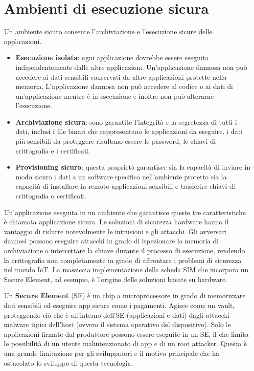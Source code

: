 \section{Ambienti di esecuzione sicura}
Un ambiente sicuro consente l'archiviazione e l'esecuzione sicure delle
applicazioni.
\begin{itemize}
    \item \textbf{Esecuzione isolata}: ogni applicazione dovrebbe essere eseguita
indipendentemente dalle altre applicazioni.
Un'applicazione dannosa non può accedere ai dati sensibili
conservati da altre applicazioni protette nella memoria.
L'applicazione dannosa non può accedere al codice o ai dati di
un'applicazione mentre è in esecuzione e inoltre non può
alterarne l'esecuzione.
    \item \textbf{Archiviazione sicura}: sono garantite l'integrità e la segretezza di tutti
i dati, inclusi i file binari che rappresentano le applicazioni da
eseguire. i dati più sensibili da proteggere risultano essere le
password, le chiavi di crittografia e i certificati.
    \item \textbf{Provisioning sicuro}: questa proprietà garantisce sia la capacità di
inviare in modo sicuro i dati a un software specifico nell'ambiente
protetto sia la capacità di installare in remoto applicazioni sensibili e
trasferire chiavi di crittografia o certificati.
\end{itemize}
Un'applicazione eseguita in un ambiente che garantisce queste tre
caratteristiche è chiamata applicazione sicura. Le soluzioni di sicurezza hardware hanno il vantaggio di ridurre
notevolmente le intrusioni e gli attacchi.
Gli avversari dannosi possono eseguire attacchi
in grado di ispezionare la memoria di archiviazione o intercettare la chiave durante il
processo di esecuzione, rendendo la crittografia non completamente in grado di affrontare i problemi di sicurezza nel mondo IoT.
La massiccia implementazione della
scheda SIM che incorpora un Secure
Element, ad esempio, è l'origine delle soluzioni
basate su hardware.

Un \textbf{Secure Element} (SE) è un chip a microprocessore in grado di
memorizzare dati sensibili ed eseguire app sicure come i
pagamenti. Agisce come un vault, proteggendo ciò che è
all'interno dell'SE (applicazioni e dati) dagli attacchi malware
tipici dell'host (ovvero il sistema operativo del dispositivo).
Solo le applicazioni firmate dal
produttore possono essere eseguite
in un SE, il che limita le possibilità di
un utente malintenzionato di app e di
un root attacker. Questa è una grande
limitazione per gli sviluppatori e il
motivo principale che ha ostacolato lo
sviluppo di questa tecnologia.

